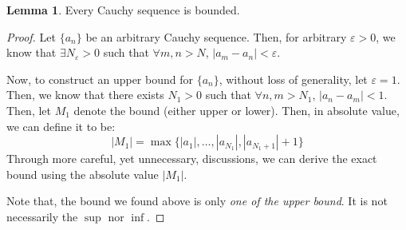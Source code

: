 \documentclass[12pt]{article}
\theoremstyle{definition}
\newtheorem{lemma}[theorem]{Lemma}
\theoremstyle{plain}
\begin{document}
\begin{lemma}
    Every Cauchy sequence is bounded.
    \label{lemma:Cauchy_is_bounded}
    \begin{proof} Let $\{a_n\}$ be an arbitrary Cauchy sequence. Then, for 
        arbitrary $\varepsilon>0$, we know that $\exists N_\varepsilon > 0$ such 
        that $\forall m,n > N$, $|a_m - a_n | < \varepsilon$.

        Now, to construct an upper bound for $\{a_n\}$, without loss of 
        generality, let $\varepsilon = 1$. Then, we know that there exists $N_1 
        > 0$ such that $\forall n,m > N_1$, $|a_n - a_m| < 1$. Then, let $M_1$ 
        denote the bound (either upper or lower). Then, in absolute value, we can 
        define it to be: 
        \[
            |M_1| = \max \{|a_1|, \ldots, |a_{N_{1}}|, |a_{N_1+1}| +  
            1\}
        \]
        Through more careful, yet unnecessary, discussions, we can derive the 
        exact bound using the absolute value $|M_1|$.

        Note that, the bound we found above is only \textit{one of the upper 
        bound}. It is not necessarily the $\sup$ nor $\inf$.
    \end{proof}
\end{lemma}
\end{document}
